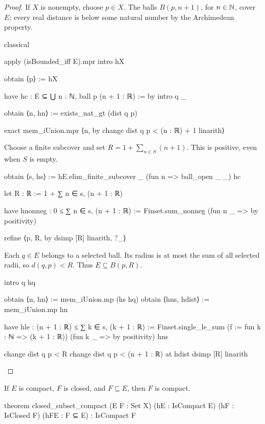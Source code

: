 \begin{proof}
  If $X$ is nonempty, choose $p\in X$.
  The balls $B(p,n+1)$, for $n\in\mathbb{N}$, cover $E$: every real distance is below some natural number
  by the Archimedean property.

  \begin{lean}
    classical

    apply (isBounded_iff E).mpr
    intro hX

    obtain ⟨p⟩ := hX

    have hc : E ⊆ ⋃ n : ℕ, ball p (n + 1 : ℝ) := by
      intro q _

      obtain ⟨n, hn⟩ := exists_nat_gt (dist q p)

      exact mem_iUnion.mpr ⟨n, by
        change dist q p < (n : ℝ) + 1
        linarith⟩
  \end{lean}

  Choose a finite subcover and set $R=1+\sum_{n\in S}(n+1)$.
  This is positive, even when $S$ is empty.

  \begin{lean}
    obtain ⟨s, hs⟩ := hE.elim_finite_subcover _ (fun n => ball_open _ _) hc

    let R : ℝ := 1 + ∑ n ∈ s, (n + 1 : ℝ)

    have hnonneg : 0 ≤ ∑ n ∈ s, (n + 1 : ℝ) :=
      Finset.sum_nonneg (fun n _ => by positivity)

    refine ⟨p, R, by
      dsimp [R]
      linarith, ?_⟩
  \end{lean}

  Each $q\in E$ belongs to a selected ball.
  Its radius is at most the sum of all selected radii, so $d(q,p)<R$.
  Thus $E\subseteq B(p,R)$.

  \begin{lean}
    intro q hq

    obtain ⟨n, hn⟩ := mem_iUnion.mp (hs hq)
    obtain ⟨hns, hdist⟩ := mem_iUnion.mp hn

    have hle : (n + 1 : ℝ) ≤ ∑ k ∈ s, (k + 1 : ℝ) :=
      Finset.single_le_sum (f := fun k : ℕ => (k + 1 : ℝ)) (fun k _ => by positivity) hns

    change dist q p < R
    change dist q p < (n + 1 : ℝ) at hdist
    dsimp [R]
    linarith
  \end{lean}

\end{proof}

\begin{proposition}
  \label{an1:thm:closed-subset-of-compact-set-is-compact}
  If $E$ is compact, $F$ is closed, and $F\subseteq E$, then $F$ is compact.

  \begin{lean}
    theorem closed_subset_compact (E F : Set X) (hE : IsCompact E)
        (hF : IsClosed F) (hFE : F ⊆ E) : IsCompact F
  \end{lean}
\end{proposition}


